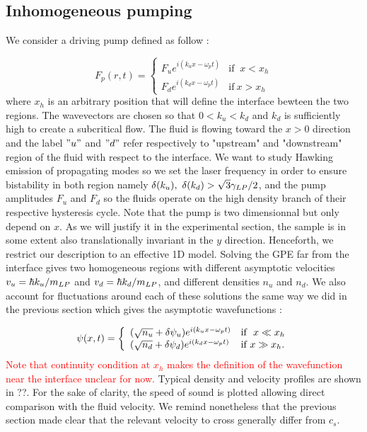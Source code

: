 \subsection{Inhomogeneous pumping}
We consider a driving pump defined as follow :

\begin{equation}
    F_p(r,t) = \left\{
        \begin{array}{ll}
            F_ue^{i(k_ux-\omega_p t)} & \mbox{if } \ x<x_h \\
            F_de^{i(k_dx-\omega_p t)} & \mbox{if} \ x>x_h
        \end{array}
    \right.
\end{equation}
where $x_h$ is an arbitrary position that will define the interface bewteen the two regions. The wavevectors are chosen so that $0<k_u<k_d$ and $k_d$ is sufficiently high to create a subcritical flow. The fluid is 
flowing toward the $x>0$ direction and the label $"u"$ and $"d"$ refer respectively to "upstream" and "downstream" region of the fluid with respect to the interface. We want to study Hawking emission of propagating modes so we set 
the laser frequency in order to ensure bistability in both region namely $\delta(k_u),\ \delta(k_d)>\sqrt{3}\gamlp/2$, and the pump amplitudes $F_u$ and $F_d$ so the fluids operate on the high density branch of their 
respective hysteresis cycle. Note that the pump is two dimensionnal but only depend on $x$. As we will justify it in the experimental section, the sample is in some extent also translationally invariant in the $y$ direction. Henceforth, we restrict our description to an effective 1D model.
Solving the GPE far from the interface gives two homogeneous regions with different asymptotic velocities $v_u=\hbar k_u/m_{LP}$ and $v_d=\hbar k_d/m_{LP}$, and different densities $n_u$ and $n_d$. We also 
account for fluctuations around each of these solutions the same way we did in the previous section which gives the asymptotic wavefunctions :

\begin{equation}
    \psi(x,t) = \left\{
        \begin{array}{ll}
            (\sqrt{n_u}+\dpsi_u)e^{i(k_ux-\omega_p t)} & \mbox{if } \ x \ll x_h \\
            (\sqrt{n_d}+\dpsi_d)e^{i(k_dx-\omega_p t)} & \mbox{if} \ x \gg x_h.
        \end{array}
    \right.
\end{equation}
\textcolor{red}{Note that continuity condition at $x_h$ makes the definition of the wavefunction near the interface unclear for now.}
Typical density and velocity profiles are shown in ??. For the sake of clarity, the speed of sound is plotted allowing direct comparison with 
the fluid velocity. We remind nonetheless that the previous section made clear that the relevant velocity to cross generally differ from $c_s$.


